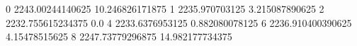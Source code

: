 0 2243.00244140625 10.246826171875
1 2235.970703125 3.215087890625
2 2232.755615234375 0.0
4 2233.6376953125 0.882080078125
6 2236.910400390625 4.15478515625
8 2247.73779296875 14.982177734375
